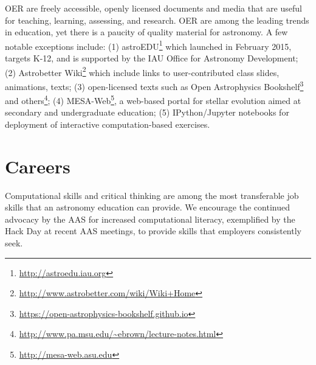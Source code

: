 \documentclass[11pt]{article}
\begin{document}
OER are freely accessible, openly
licensed documents and media that are useful for teaching, learning,
assessing, and research. OER are among the leading trends in 
education, yet there is a paucity of quality material for
astronomy. A few notable exceptions include: (1)
astroEDU\footnote{\url{http://astroedu.iau.org}} which
launched in February 2015, targets K-12, and is supported by the IAU
Office for Astronomy Development; (2) Astrobetter
Wiki\footnote{\url{http://www.astrobetter.com/wiki/Wiki+Home}} which
include links to user-contributed class slides, animations, texts;
(3) open-licensed texts such as Open Astrophysics Bookshelf\footnote{\url{https://open-astrophysics-bookshelf.github.io}}
and others\footnote{\url{http://www.pa.msu.edu/~ebrown/lecture-notes.html}};
(4) MESA-Web\footnote{\url{http://mesa-web.asu.edu}}, a
web-based portal for stellar evolution aimed at secondary and undergraduate education;
(5) IPython/Jupyter notebooks for deployment of interactive computation-based exercises.


\section{Careers}

Computational skills and critical thinking are among the most
transferable job skills that an astronomy education can provide.
We encourage the continued advocacy by the AAS for increased
computational literacy, exemplified by the Hack Day at recent AAS meetings, 
to provide skills that employers consistently seek.


\end{document}
